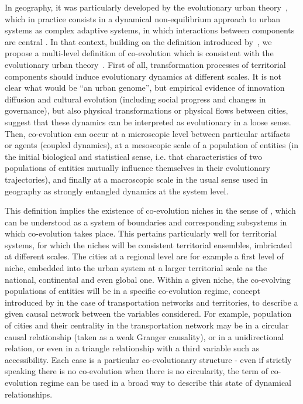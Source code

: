 \documentclass[11pt]{article}
\begin{document}
In geography, it was particularly developed by the evolutionary urban theory~\cite{pumain1997pour}, which in practice consists in a dynamical non-equilibrium approach to urban systems as complex adaptive systems, in which interactions between components are central \cite{paulus2004coevolution,schmitt2014modelisation}. In that context, building on the definition introduced by~\cite{raimbault2018co,raimbault2018caracterisation}, we propose a multi-level definition of co-evolution which is consistent with the evolutionary urban theory~\cite{pumain2018evolutionary}. First of all, transformation processes of territorial components should induce evolutionary dynamics at different scales. It is not clear what would be ``an urban genome'', but empirical evidence of innovation diffusion and cultural evolution (including social progress and changes in governance), but also physical transformations or physical flows between cities, suggest that these dynamics can be interpreted as evolutionary in a loose sense. Then, co-evolution can occur at a microscopic level between particular artifacts or agents (coupled dynamics), at a mesoscopic scale of a population of entities (in the initial biological and statistical sense, i.e. that characteristics of two populations of entities mutually influence themselves in their evolutionary trajectories), and finally at a macroscopic scale in the usual sense used in geography as strongly entangled dynamics at the system level.

This definition implies the existence of co-evolution niches in the sense of \cite{holland2012signals}, which can be understood as a system of boundaries and corresponding subsystems in which co-evolution takes place. This pertains particularly well for territorial systems, for which the niches will be consistent territorial ensembles, imbricated at different scales. The cities at a regional level are for example a first level of niche, embedded into the urban system at a larger territorial scale as the national, continental and even global one. Within a given niche, the co-evolving populations of entities will be in a specific co-evolution regime, concept introduced by \cite{raimbault2017identification} in the case of transportation networks and territories, to describe a given causal network between the variables considered. For example, population of cities and their centrality in the transportation network may be in a circular causal relationship (taken as a weak Granger causality), or in a unidirectional relation, or even in a triangle relationship with a third variable such as accessibility. Each case is a particular co-evolutionary structure - even if strictly speaking there is no co-evolution when there is no circularity, the term of co-evolution regime can be used in a broad way to describe this state of dynamical relationships.
\end{document}
